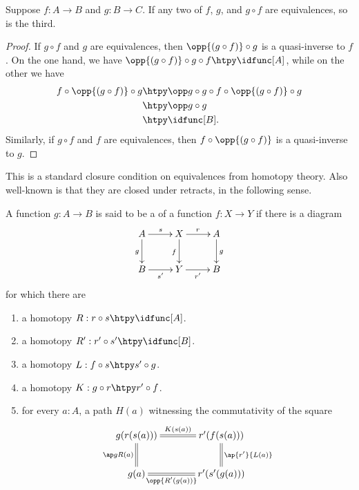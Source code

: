 \begin{thm}\label{thm:two-out-of-three}
  Suppose $f:A\to B$ and $g:B\to C$.
  If any two of $f$, $g$, and $g\circ f$ are equivalences, so is the third.
\end{thm}
\begin{proof}
  If $g\circ f$ and $g$ are equivalences, then $\opp{(g\circ f)} \circ g$ is a quasi-inverse to $f$.
  On the one hand, we have $\opp{(g\circ f)} \circ g \circ f \htpy \idfunc[A]$, while on the other we have
  \begin{align*}
    f \circ \opp{(g\circ f)} \circ g
    &\htpy \opp g \circ g \circ f \circ \opp{(g\circ f)} \circ g\\
    &\htpy \opp g \circ g\\
    &\htpy \idfunc[B].
  \end{align*}
  Similarly, if $g\circ f$ and $f$ are equivalences, then $f\circ \opp{(g\circ f)}$ is a quasi-inverse to $g$.
\end{proof}

This is a standard closure condition on equivalences from homotopy theory.
Also well-known is that they are closed under retracts, in the following sense.

%

\begin{defn}\label{defn:retract}
A function $g:A\to B$ is said to be a 
of a function $f:X\to Y$ if there is a diagram
\begin{equation*}
  \xymatrix{
    {A} \ar[r]^{s} \ar[d]_{g}
    &
    {X} \ar[r]^{r} \ar[d]_{f}
    &
    {A} \ar[d]^{g}
    \\
    {B} \ar[r]_{s'}
    &
    {Y} \ar[r]_{r'}
    &
    {B}
  }
\end{equation*}
for which there are
\begin{enumerate}
\item a homotopy $R:r\circ s \htpy \idfunc[A]$.
\item a homotopy $R':r'\circ s' \htpy\idfunc[B]$.
\item a homotopy $L:f\circ s\htpy s'\circ g$.
\item a homotopy $K:g\circ r\htpy r'\circ f$.
\item for every $a:A$, a path $H(a)$ witnessing the commutativity of the square
\begin{equation*}
  \xymatrix@C=3pc{
    {g(r(s(a)))} \ar@{=}[r]^-{K(s(a))} \ar@{=}[d]_{\ap g{R(a)}}
    &
    {r'(f(s(a)))} \ar@{=}[d]^{\ap{r'}{L(a)}}
    \\
    {g(a)} \ar@{=}[r]_-{\opp{R'(g(a))}}
    &
    {r'(s'(g(a)))}
  }
\end{equation*}
\end{enumerate}
\end{defn}

